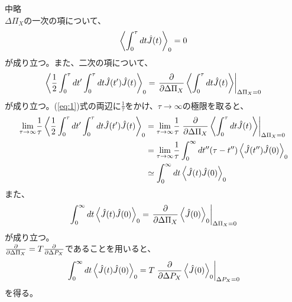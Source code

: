 \documentclass[a4paper,11pt]{jsarticle}
\begin{document}
中略\\
$\Delta \Pi_X$の一次の項について、
\begin{align}
    \ev{\int_{0}^{\tau} dt \hat{J}(t)}_0 =0
\end{align}
が成り立つ。また、二次の項について、
\begin{equation}
    \label{eq:1}
    \ev{\frac{1}{2}\int_{0}^{\tau} dt' \int_{0}^{\tau} dt \hat{J}(t')\hat{J}(t)}_0 = \left. \pdv{\Delta \Pi_X} \ev{\int_{0}^{\tau} dt \hat{J}(t)}\right|_{\Delta \Pi_X = 0}
\end{equation}
が成り立つ。(\ref{eq:1})式の両辺に$\frac{1}{\tau}$をかけ、$\tau \to \infty$の極限を取ると、
\begin{align}
    \underset{\tau \to \infty}{\text{lim}} \frac{1}{\tau} \ev{\frac{1}{2}\int_{0}^{\tau} dt' \int_{0}^{\tau} dt \hat{J}(t')\hat{J}(t)}_0 
    &=\underset{\tau \to \infty}{\text{lim}} \frac{1}{\tau} \left.\pdv{\Delta \Pi_X} \ev{\int_{0}^{\tau} dt \hat{J}(t)}\right|_{\Delta \Pi_X = 0}\\
    &=\underset{\tau \to \infty}{\text{lim}} \frac{1}{\tau} \int_{0}^{\infty} dt''(\tau - t'')\ev{\hat{J}(t'')\hat{J}(0)}_0\\
    &\simeq \int_{0}^{\infty} dt \ev{\hat{J}(t)\hat{J}(0)}_0
\end{align}
また、%
\begin{equation}
    \int_{0}^{\infty} dt \ev{\hat{J}(t)\hat{J}(0)}_0 = \left.\pdv{\Delta \Pi_X} \ev{\hat{J}(0)}_0\right|_{\Delta \Pi_X = 0}
\end{equation}
が成り立つ。\\
$\pdv{\Delta \Pi_X} =T\pdv{\Delta P_X}$であることを用いると、
\begin{equation}
    \int_{0}^{\infty} dt \ev{\hat{J}(t)\hat{J}(0)}_0 = T\left.\pdv{\Delta P_X} \ev{\hat{J}(0)}_0\right|_{\Delta P_X = 0}
\end{equation}
を得る。\hfill \qedsymbol
\end{document}
